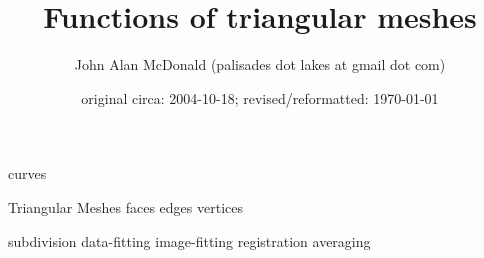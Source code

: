 \documentclass[11pt]{PalisadesLakesArticle}
\title{Functions of triangular meshes}
\author{John Alan McDonald (palisades dot lakes at gmail dot com)}
\date{original circa: 2004-10-18; revised/reformatted: \today}
\begin{document}
\maketitle
\def\sharedFolder{../../shared/}





{curves}
\begin{plSection}{Triangular Meshes}
{faces}
{edges}
{vertices}
\end{plSection}%
{subdivision}
{data-fitting}
{image-fitting}
{registration}
{averaging}

\end{document}
